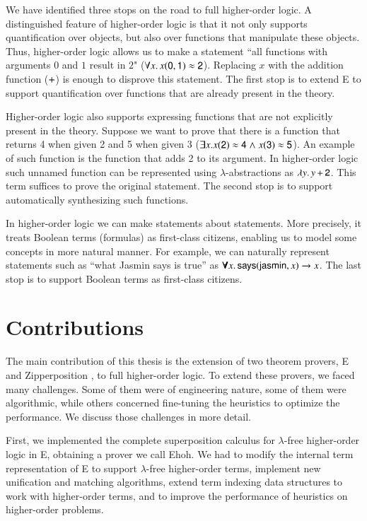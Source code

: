 We have identified three stops on the road to full higher-order logic. A
distinguished feature of higher-order logic is that it not only supports
quantification over objects, but also over functions that manipulate these
objects. Thus, higher-order logic allows us to make a statement ``all functions
with arguments $0$ and $1$ result in $2$" ($\forall x. \,  x (\mathsf{0}, \mathsf{1}) \approx
\mathsf{2}$). Replacing $x$ with the addition function ($\mathsf{+}$) is enough to
disprove this statement. The first stop is to extend E to support
quantification over functions that are already present in the theory.

Higher-order logic also supports expressing functions that are not explicitly
present in the theory. Suppose we want to prove that there is a
function that returns 4 when given 2 and 5 when given 3 ($\exists x. x(\mathsf{2})
\approx \mathsf{4} \mathrel\land x (\mathsf{3}) \approx \mathsf{5} $). An example of such function is
the function that adds 2 to its argument. In higher-order logic such unnamed
function can be represented using $\lambda$-abstractions as $\lambda y.\, y \,
\mathsf{+} \, \mathsf{2}$. This term suffices to prove the original statement. The
second stop is to support automatically synthesizing such functions.

In higher-order logic we can make statements about statements. More precisely,
it treats Boolean terms (formulas) as first-class citizens, enabling us to
model some concepts in more natural manner. For example, we can naturally
represent statements such as ``what Jasmin says is true'' as $\pmb\forall x. \,
\mathsf{says}(\mathsf{jasmin}, x) \rightarrow x$. The last stop is to support Boolean terms
as first-class citizens.
\pagebreak[2]

\section{Contributions}

The main contribution of this thesis is the extension of two theorem provers,
E and Zipperposition \cite{sc-15-simon-phd}, to full higher-order logic. To
extend these provers, we faced many challenges. Some of them were of engineering
nature, some of them were algorithmic, while others concerned fine-tuning the
heuristics to optimize the performance. We discuss those challenges in more detail.

  
  First, we implemented the complete superposition calculus for $\lambda$-free
  higher-order logic \cite{bbcw-21-lfho} in E, obtaining a prover we call Ehoh.
  We had to modify the internal term representation of E to support $\lambda$-free
  higher-order terms, implement new unification and matching algorithms, extend
  term indexing data structures to work with higher-order terms, and to improve the
  performance of heuristics on higher-order problems.
  
